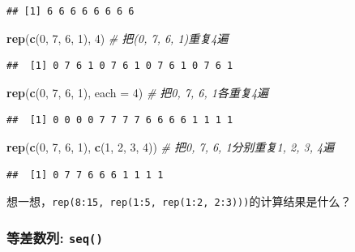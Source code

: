 \documentclass[]{book}
\newenvironment{Shaded}{\begin{snugshade}}{\end{snugshade}}
\newcommand{\CommentTok}[1]{\textcolor[rgb]{0.56,0.35,0.01}{\textit{#1}}}
\newcommand{\DataTypeTok}[1]{\textcolor[rgb]{0.13,0.29,0.53}{#1}}
\newcommand{\DecValTok}[1]{\textcolor[rgb]{0.00,0.00,0.81}{#1}}
\newcommand{\KeywordTok}[1]{\textcolor[rgb]{0.13,0.29,0.53}{\textbf{#1}}}
\newcommand{\NormalTok}[1]{#1}
\begin{document}
\begin{verbatim}
## [1] 6 6 6 6 6 6 6 6
\end{verbatim}

\begin{Shaded}
\begin{Highlighting}[]
\KeywordTok{rep}\NormalTok{(}\KeywordTok{c}\NormalTok{(}\DecValTok{0}\NormalTok{, }\DecValTok{7}\NormalTok{, }\DecValTok{6}\NormalTok{, }\DecValTok{1}\NormalTok{), }\DecValTok{4}\NormalTok{) }\CommentTok{# 把(0, 7, 6, 1)重复4遍}
\end{Highlighting}
\end{Shaded}

\begin{verbatim}
##  [1] 0 7 6 1 0 7 6 1 0 7 6 1 0 7 6 1
\end{verbatim}

\begin{Shaded}
\begin{Highlighting}[]
\KeywordTok{rep}\NormalTok{(}\KeywordTok{c}\NormalTok{(}\DecValTok{0}\NormalTok{, }\DecValTok{7}\NormalTok{, }\DecValTok{6}\NormalTok{, }\DecValTok{1}\NormalTok{), }\DataTypeTok{each =} \DecValTok{4}\NormalTok{) }\CommentTok{# 把0, 7, 6, 1各重复4遍}
\end{Highlighting}
\end{Shaded}

\begin{verbatim}
##  [1] 0 0 0 0 7 7 7 7 6 6 6 6 1 1 1 1
\end{verbatim}

\begin{Shaded}
\begin{Highlighting}[]
\KeywordTok{rep}\NormalTok{(}\KeywordTok{c}\NormalTok{(}\DecValTok{0}\NormalTok{, }\DecValTok{7}\NormalTok{, }\DecValTok{6}\NormalTok{, }\DecValTok{1}\NormalTok{), }\KeywordTok{c}\NormalTok{(}\DecValTok{1}\NormalTok{, }\DecValTok{2}\NormalTok{, }\DecValTok{3}\NormalTok{, }\DecValTok{4}\NormalTok{)) }\CommentTok{# 把0, 7, 6, 1分别重复1, 2, 3, 4遍}
\end{Highlighting}
\end{Shaded}

\begin{verbatim}
##  [1] 0 7 7 6 6 6 1 1 1 1
\end{verbatim}

想一想，\texttt{rep(8:15,\ rep(1:5,\ rep(1:2,\ 2:3)))}的计算结果是什么？

\hypertarget{-seq}{%
\subsubsection{\texorpdfstring{等差数列: \texttt{seq()}}{等差数列: seq()}}\label{-seq}}
\end{document}
